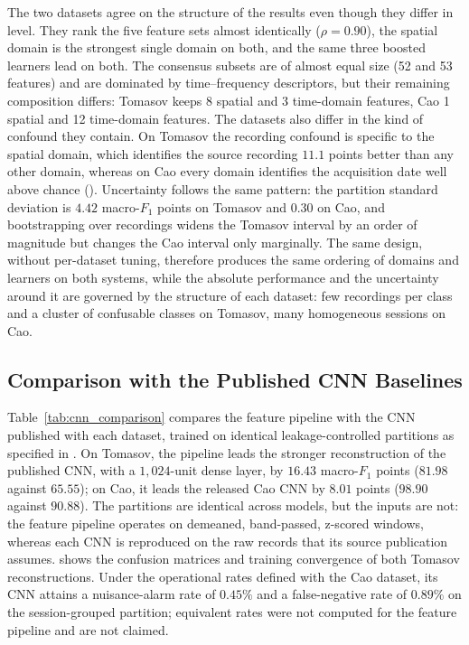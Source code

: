 The two datasets agree on the structure of the results even though they differ in level. They rank the five feature sets almost identically ($\rho = 0.90$), the spatial domain is the strongest single domain on both, and the same three boosted learners lead on both. The consensus subsets are of almost equal size (52 and 53 features) and are dominated by time--frequency descriptors, but their remaining composition differs: Tomasov keeps 8 spatial and 3 time-domain features, Cao 1 spatial and 12 time-domain features. The datasets also differ in the kind of confound they contain. On Tomasov the recording confound is specific to the spatial domain, which identifies the source recording $11.1$ points better than any other domain, whereas on Cao every domain identifies the acquisition date well above chance (). Uncertainty follows the same pattern: the partition standard deviation is $4.42$ macro-$F_1$ points on Tomasov and $0.30$ on Cao, and bootstrapping over recordings widens the Tomasov interval by an order of magnitude but changes the Cao interval only marginally. The same design, without per-dataset tuning, therefore produces the same ordering of domains and learners on both systems, while the absolute performance and the uncertainty around it are governed by the structure of each dataset: few recordings per class and a cluster of confusable classes on Tomasov, many homogeneous sessions on Cao.

\subsection{Comparison with the Published CNN Baselines}
\label{sec:resCNN}
Table~\ref{tab:cnn_comparison} compares the feature pipeline with the CNN published with each dataset, trained on identical leakage-controlled partitions as specified in . On Tomasov, the pipeline leads the stronger reconstruction of the published CNN, with a $1{,}024$-unit dense layer, by $16.43$ macro-$F_1$ points ($81.98$ against $65.55$); on Cao, it leads the released Cao CNN by $8.01$ points ($98.90$ against $90.88$). The partitions are identical across models, but the inputs are not: the feature pipeline operates on demeaned, band-passed, z-scored windows, whereas each CNN is reproduced on the raw records that its source publication assumes.  shows the confusion matrices and training convergence of both Tomasov reconstructions. Under the operational rates defined with the Cao dataset, its CNN attains a nuisance-alarm rate of $0.45\%$ and a false-negative rate of $0.89\%$ on the session-grouped partition; equivalent rates were not computed for the feature pipeline and are not claimed.

